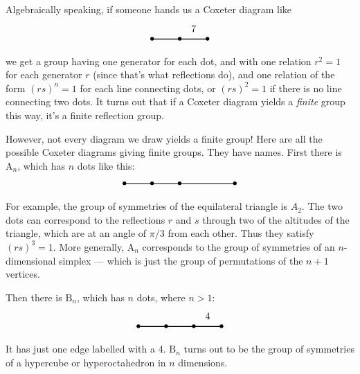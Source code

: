 \documentclass{article}
\begin{document}
Algebraically speaking, if someone hands us a Coxeter diagram like \[
  \begin{tikzpicture}
    \draw[thick] (0,0) node{$\bullet$} to (1,0) node{$\bullet$} to node[label=above:{7}]{} (2,0) node {$\bullet$};
  \end{tikzpicture}
\] we get a group having one generator for each dot, and with one
relation \(r^2 = 1\) for each generator \(r\) (since that's what
reflections do), and one relation of the form \((rs)^n = 1\) for each
line connecting dots, or \((rs)^2 = 1\) if there is no line connecting
two dots. It turns out that if a Coxeter diagram yields a \emph{finite}
group this way, it's a finite reflection group.

However, not every diagram we draw yields a finite group! Here are all
the possible Coxeter diagrams giving finite groups. They have names.
First there is \(\mathrm{A}_n\), which has \(n\) dots like this: \[
  \begin{tikzpicture}
    \draw[thick] (0,0) node{$\bullet$} to (1,0) node{$\bullet$} to (2,0) node {$\bullet$} to (4,0) node{$\bullet$};
  \end{tikzpicture}
\] For example, the group of symmetries of the equilateral triangle is
\(A_2\). The two dots can correspond to the reflections \(r\) and \(s\)
through two of the altitudes of the triangle, which are at an angle of
\(\pi/3\) from each other. Thus they satisfy \((rs)^3 = 1\). More
generally, \(\mathrm{A}_n\) corresponds to the group of symmetries of an
\(n\)-dimensional simplex --- which is just the group of permutations of
the \(n+1\) vertices.

Then there is \(\mathrm{B}_n\), which has \(n\) dots, where \(n > 1\):
\[
  \begin{tikzpicture}
    \draw[thick] (0,0) node{$\bullet$} to (1,0) node{$\bullet$} to (2,0) node{$\bullet$} to node[label=above:{4}]{} (3,0) node {$\bullet$};
  \end{tikzpicture}
\] It has just one edge labelled with a 4. \(\mathrm{B}_n\) turns out to
be the group of symmetries of a hypercube or hyperoctahedron in \(n\)
dimensions.
\end{document}
